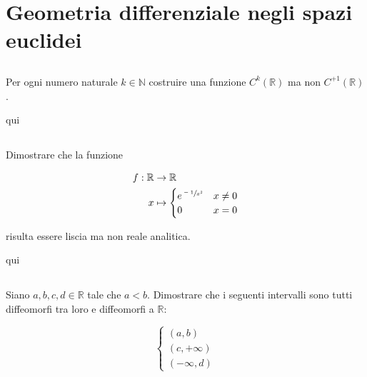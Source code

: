 \chapter{Geometria differenziale negli spazi euclidei}

\section{}\label{es1-1}

\begin{tcolorbox}
	Per ogni numero naturale $ k \in \mathbb{N} $ costruire una funzione $ C^{k}(\mathbb{R}) $ ma non $ C^{+1}(\mathbb{R}) $.
\end{tcolorbox}

qui

\section{}\label{es1-2}

\begin{tcolorbox}
	Dimostrare che la funzione
	
	\begin{align}
		\begin{split}
			f : \mathbb{R} & \to \mathbb{R}\\
			x &\mapsto%
				\begin{cases}
					e^{\sfrac{-1}{x^{2}}} & x \neq 0\\
					0 & x = 0
				\end{cases}
		\end{split}
	\end{align}
	
	risulta essere liscia ma non reale analitica.
\end{tcolorbox}

qui

\section{}\label{es1-3}

\begin{tcolorbox}
	Siano $ a,b,c,d \in \mathbb{R} $ tale che $ a<b $. Dimostrare che i seguenti intervalli sono tutti diffeomorfi tra loro e diffeomorfi a $ \mathbb{R} $:
	
	\begin{equation}
		\begin{cases}
			(a,b)\\
			(c,+\infty)\\
			(-\infty,d)
		\end{cases}
	\end{equation}
\end{tcolorbox}

